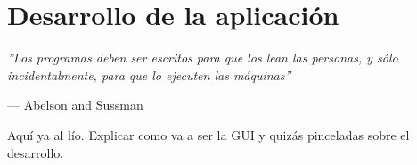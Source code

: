 \chapter{Desarrollo de la aplicación}

\epigraph{\textit{''Los programas deben ser escritos para que los lean las personas, y sólo incidentalmente, para que lo ejecuten las máquinas''}}{--- Abelson and Sussman}

{\color{red} Aquí ya al lío. Explicar como va a ser la GUI y quizás pinceladas sobre el desarrollo.}